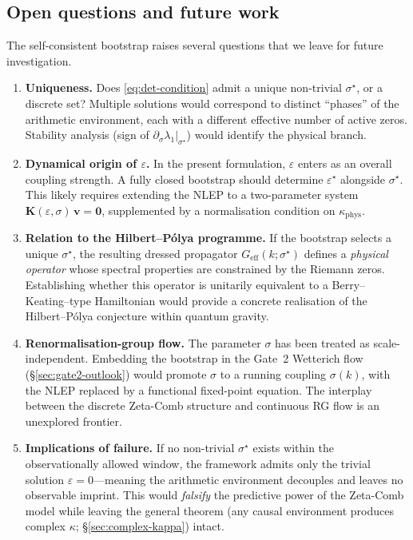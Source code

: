 \documentclass[12pt,a4paper]{article}
\begin{document}
\subsection{Open questions and future work}
\label{subsec:open-questions}

The self-consistent bootstrap raises several questions that
we leave for future investigation.

\begin{enumerate}
  \item \textbf{Uniqueness.}
    Does \eqref{eq:det-condition} admit a unique non-trivial
    $\sigma^{\star}$, or a discrete set?
    Multiple solutions would correspond to distinct
    ``phases'' of the arithmetic environment, each with a
    different effective number of active zeros.
    Stability analysis (sign of
    $\partial_{\sigma}\lambda_{1}|_{\sigma^{\star}}$) would
    identify the physical branch.

  \item \textbf{Dynamical origin of $\varepsilon$.}
    In the present formulation, $\varepsilon$ enters as an
    overall coupling strength.
    A fully closed bootstrap should determine
    $\varepsilon^{\star}$ alongside $\sigma^{\star}$.
    This likely requires extending the NLEP to a
    two-parameter system
    $\mathbf{K}(\varepsilon,\sigma)\,\mathbf{v} = \mathbf{0}$,
    supplemented by a normalisation condition on
    $\kappa_{\mathrm{phys}}$.

  \item \textbf{Relation to the Hilbert--P\'olya programme.}
    If the bootstrap selects a unique $\sigma^{\star}$, the
    resulting dressed propagator
    $G_{\mathrm{eff}}(k;\sigma^{\star})$ defines a
    \emph{physical operator} whose spectral properties are
    constrained by the Riemann zeros.
    Establishing whether this operator is unitarily equivalent
    to a Berry--Keating--type Hamiltonian would provide a
    concrete realisation of the Hilbert--P\'olya conjecture
    within quantum gravity.

  \item \textbf{Renormalisation-group flow.}
    The parameter $\sigma$ has been treated as scale-independent.
    Embedding the bootstrap in the Gate~2 Wetterich flow
    (\S\ref{sec:gate2-outlook}) would promote $\sigma$ to a
    running coupling $\sigma(k)$, with the NLEP replaced by a
    functional fixed-point equation.
    The interplay between the discrete Zeta-Comb structure
    and continuous RG flow is an unexplored frontier.

  \item \textbf{Implications of failure.}
    If no non-trivial $\sigma^{\star}$ exists within the
    observationally allowed window, the framework admits only
    the trivial solution $\varepsilon = 0$---meaning the
    arithmetic environment decouples and leaves no observable
    imprint.
    This would \emph{falsify} the predictive power of the
    Zeta-Comb model while leaving the general theorem
    (any causal environment produces complex $\kappa$;
    \S\ref{sec:complex-kappa}) intact.
\end{enumerate}
\end{document}
